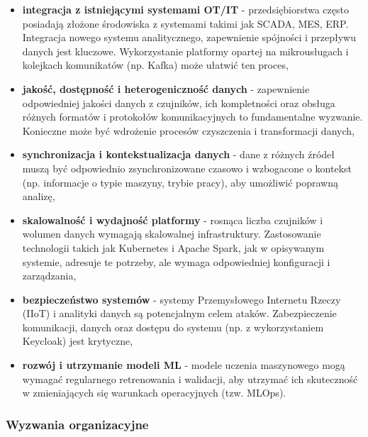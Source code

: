 \begin{itemize}
    \item \textbf{integracja z istniejącymi systemami OT/IT} - przedsiębiorstwa często posiadają złożone środowiska z systemami takimi jak SCADA, MES, ERP. Integracja nowego systemu analitycznego, zapewnienie spójności i przepływu danych jest kluczowe. Wykorzystanie platformy opartej na mikrousługach i kolejkach komunikatów (np. Kafka) może ułatwić ten proces,
    \item \textbf{jakość, dostępność i heterogeniczność danych} - zapewnienie odpowiedniej jakości danych z czujników, ich kompletności oraz obsługa różnych formatów i protokołów komunikacyjnych to fundamentalne wyzwanie. Konieczne może być wdrożenie procesów czyszczenia i transformacji danych,
    \item \textbf{synchronizacja i kontekstualizacja danych} - dane z różnych źródeł muszą być odpowiednio zsynchronizowane czasowo i wzbogacone o kontekst (np. informacje o typie maszyny, trybie pracy), aby umożliwić poprawną analizę,
    \item \textbf{skalowalność i wydajność platformy} - rosnąca liczba czujników i wolumen danych wymagają skalowalnej infrastruktury. Zastosowanie technologii takich jak Kubernetes i Apache Spark, jak w opisywanym systemie, adresuje te potrzeby, ale wymaga odpowiedniej konfiguracji i zarządzania,
    \item \textbf{bezpieczeństwo systemów} - systemy Przemysłowego Internetu Rzeczy (IIoT) i analityki danych są potencjalnym celem ataków. Zabezpieczenie komunikacji, danych oraz dostępu do systemu (np. z wykorzystaniem Keycloak) jest krytyczne,
    \item \textbf{rozwój i utrzymanie modeli ML} - modele uczenia maszynowego mogą wymagać regularnego retrenowania i walidacji, aby utrzymać ich skuteczność w zmieniających się warunkach operacyjnych (tzw. MLOps).
\end{itemize}

\subsubsection{Wyzwania organizacyjne}
\label{subsubsec:wyzwania_organizacyjne}

